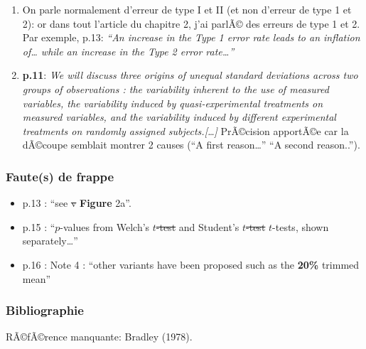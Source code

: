 \begin{appendix}
\begin{enumerate}
\def\labelenumi{\arabic{enumi})}
\setcounter{enumi}{3}
\item
  On parle normalement d'erreur de type I et II (et non d'erreur de type
  1 et 2): or dans tout l'article du chapitre 2, j'ai parlÃ© des erreurs
  de type 1 et 2. Par exemple, p.13: \emph{``An increase in the Type 1
  error rate leads to an inflation of\ldots{} while an increase in the
  Type 2 error rate\ldots{}''}
\item
  \textbf{p.11}: \emph{We will discuss three origins of unequal standard
  deviations across two groups of observations : \color{blue} the
  variability inherent to the use of measured variables, the variability
  induced by quasi-experimental treatments on measured variables, and
  the variability induced by different experimental treatments on
  randomly assigned subjects.{[}\ldots{]} } \color{black} PrÃ©cision
  apportÃ©e car la dÃ©coupe semblait montrer 2 causes (``A first
  reason\ldots{}'' ``A second reason..'').
\end{enumerate}

\hypertarget{fautes-de-frappe}{%
\subsubsection{Faute(s) de frappe}\label{fautes-de-frappe}}

\begin{itemize}
\tightlist
\item
  p.13 : ``see \sout{v} \textbf{Figure} 2a''.
\item
  p.15 : ``\(p\)-values from Welch's \sout{\(t\)-test} and Student's
  \sout{\(t\)-test} \(t\)-tests, shown separately\ldots{}''
\item
  p.16 : Note 4 : ``other variants have been proposed such as the
  \textbf{20\%} trimmed mean''
\end{itemize}

\hypertarget{bibliographie}{%
\subsubsection{Bibliographie}\label{bibliographie}}

RÃ©fÃ©rence manquante: Bradley (1978).

\newpage

\hypertarget{annexe-b-erratum-de-larticle-taking-parametric-assumptions-very-seriously-arguments-for-the-use-of-welchuxe2s-f-test-instead-of-the-classical-f-test-in-one-way-anova-chapitre-3}{%
}
\end{appendix}
